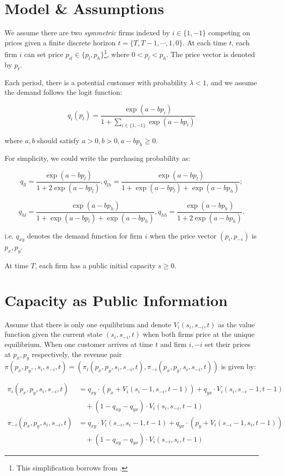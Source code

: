 \documentclass[12pt,letterpaper]{article}
\begin{document}
\section{Model \& Assumptions}

We assume there are two \textit{symmetric} firms indexed by $i\in\{1,-1\}$ competing on prices given a finite discrete horizon $t=\{T,T-1,\cdots,1,0\}$. At each time $t$, each firm $i$ can set price $p_{it}\in\{p_l,p_h\}$\footnote{This simplification borrows from \cite{miklos2019collusion}.}, where $0<p_l<p_h$. The price vector is denoted by $p_t$. 

Each period, there is a potential customer with probability $\lambda<1$, and we assume the demand follows the logit function:

\[
    q_i(p_t) = \frac{\exp(a-bp_i)}{1+\sum_{i\in\{1,-1\}}\exp(a-bp_i) }
\]

where $a, b$ should satisfy $a>0, b>0, a-bp_h\ge0$.

For simplicity, we could write the purchasing probability as:

\[
    q_{ll} = \frac{\exp(a-bp_l)}{1+2\exp(a-bp_l)}, q_{lh} = \frac{\exp(a-bp_l)}{1+\exp(a-bp_l)+\exp(a-bp_h)};
\]

\[
    q_{hl} = \frac{\exp(a-bp_h)}{1+\exp(a-bp_l)+\exp(a-bp_h)}, q_{hh} = \frac{\exp(a-bp_h)}{1+2\exp(a-bp_h)}.
\]

i.e. $q_{xy}$ denotes the demand function for firm $i$ when the price vector $(p_i,p_{-i})$ is $p_x,p_y$. 

At time $T$, each firm has a public initial capacity $s\ge0$. 

\section{Capacity as Public Information}

Assume that there is only one equilibrium and denote $V_i(s_i, s_{-i}, t)$ as the value function given the current state $(s_i, s_{-i}, t)$ when both firms price at the unique equilibrium. When one customer arrives at time $t$ and firm $i,-i$ set their prices at $p_x, p_y$ respectively, the revenue pair $\pi(p_x,p_y, ,s_i,s_{-i},t) = (\pi_i(p_x,p_y,s_i,s_{-i},t), \pi_{-i}(p_x,p_y,s_i,s_{-i},t))$ is given by:

\begin{align}
    \pi_i(p_x,p_y,s_i,s_{-i},t) &= q_{xy}\cdot (p_x+V_i(s_i-1,s_{-i},t-1)) + q_{yx}\cdot V_i(s_i, s_{-i}-1, t-1) \nonumber \\
    &\quad + (1-q_{xy}-q_{yx}) \cdot V_i(s_i,s_{-i},t-1) \nonumber \\
    \pi_{-i}(p_x,p_y,s_i,s_{-i},t) &= q_{xy}\cdot V_i(s_{-i}, s_i-1, t-1) + q_{yx}\cdot (p_y+V_i(s_{-i}-1, s_i, t-1)) \nonumber \\
    &\quad + (1-q_{xy}-q_{yx}) \cdot V_i(s_{-i},s_{i},t-1) \label{eq:revenue_pair}
\end{align}
    
\end{document}
